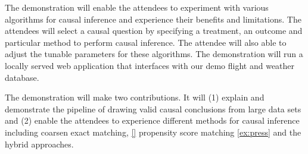 
\vspace{-0.1cm}


\vspace{-2mm}

The demonstration will enable the attendees to experiment with various algorithms for causal inference
  and experience their benefits and limitations.
The attendees will select a causal question by specifying a treatment,
  an outcome and particular method to perform causal inference.
The attendee will also able to adjust the tunable parameters for these algorithms.
The demonstration will run a locally served web application that interfaces with our demo flight and weather database.

The demonstration will make two contributions. It will
  (1) explain and demonstrate the pipeline of drawing valid causal conclusions from large data sets and
  (2) enable the attendees to experience different methods for causal inference including coarsen exact matching, \ref{} propensity score matching \ref{ex:press} and the hybrid approaches.
